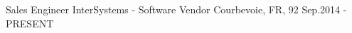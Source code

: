 

\begin{cventries}

  \cventry
    {Sales Engineer} %
    {InterSystems - Software Vendor} %
    {Courbevoie, FR, 92} %
    {Sep.2014 - PRESENT} %
    {}
    {
      \begin{cvitems} %
        \item {}
      \end{cvitems}
    }


\end{cventries}
